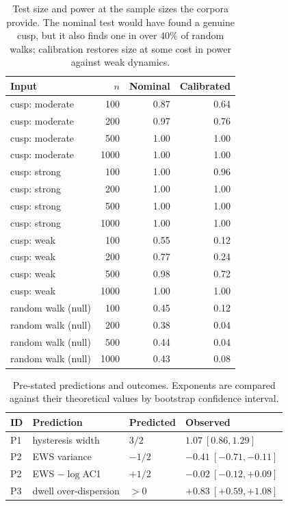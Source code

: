\begin{table}[t]
\caption{Test size and power at the sample sizes the corpora provide. The nominal test would have found a genuine cusp, but it also finds one in over 40\% of random walks; calibration restores size at some cost in power against weak dynamics.}
\label{tab:powersize}
\centering
\begin{tabular}{@{}lrrr@{}}
\toprule
Input & $n$ & Nominal & Calibrated \\
\midrule
cusp: moderate & 100 & 0.87 & 0.64 \\
cusp: moderate & 200 & 0.97 & 0.76 \\
cusp: moderate & 500 & 1.00 & 1.00 \\
cusp: moderate & 1000 & 1.00 & 1.00 \\
cusp: strong & 100 & 1.00 & 0.96 \\
cusp: strong & 200 & 1.00 & 1.00 \\
cusp: strong & 500 & 1.00 & 1.00 \\
cusp: strong & 1000 & 1.00 & 1.00 \\
cusp: weak & 100 & 0.55 & 0.12 \\
cusp: weak & 200 & 0.77 & 0.24 \\
cusp: weak & 500 & 0.98 & 0.72 \\
cusp: weak & 1000 & 1.00 & 1.00 \\
random walk (null) & 100 & 0.45 & 0.12 \\
random walk (null) & 200 & 0.38 & 0.04 \\
random walk (null) & 500 & 0.44 & 0.04 \\
random walk (null) & 1000 & 0.43 & 0.08 \\
\bottomrule
\end{tabular}
\end{table}

\begin{table}[t]
\caption{Pre-stated predictions and outcomes. Exponents are compared against their theoretical values by bootstrap confidence interval.}
\label{tab:predictions}
\centering
\begin{tabular}{@{}llll@{}}
\toprule
ID & Prediction & Predicted & Observed \\
\midrule
P1 & hysteresis width & $3/2$ & $1.07\ [0.86, 1.29]$ \\
P2 & EWS variance & $-1/2$ & $-0.41\ [-0.71, -0.11]$ \\
P2 & EWS $-\log$AC1 & $+1/2$ & $-0.02\ [-0.12, +0.09]$ \\
P3 & dwell over-dispersion & $>0$ & $+0.83\ [+0.59, +1.08]$ \\
\bottomrule
\end{tabular}
\end{table}